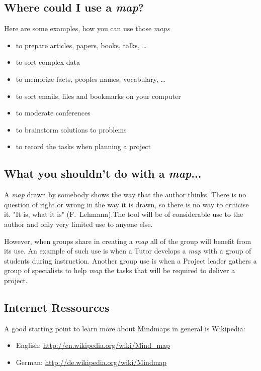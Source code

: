 \documentclass[12pt,a4paper]{article}
\begin{document}
\subsection{Where could I use a {\em map}?}
Here are some examples, how you can use those {\em maps}
\begin{itemize}
    \item to prepare articles, papers, books, talks, \ldots
    \item to sort complex data
    \item to memorize facts, peoples names, vocabulary, \ldots
    \item to sort emails, files and bookmarks on your computer
    \item to moderate conferences
    \item to brainstorm solutions to problems
    \item to record the tasks when planning a project
\end{itemize}

\subsection{What you shouldn't do with a {\em map}...}
A {\em map} drawn by somebody shows the way that the author thinks. There is
no question of right or wrong in the way it is drawn, so there is no way to criticise
it. "It is, what it is" ({\sc F.~Lehmann}).The tool will be of considerable use to the author and only very limited use to anyone else. 

However, when groups share in creating a {\em map} all of the group will benefit from its use. An example of such use is when a Tutor develops a {\em map} with a group of students during instruction. Another group use is when a Project leader gathers a group of specialists to help {\em map} the tasks that will be required to deliver a project.


\subsection{Internet Ressources} 
A good starting point to learn more about Mindmaps in general is Wikipedia:
\begin{itemize}
    \item English: 
        \href{http://en.wikipedia.org/wiki/Mind_map}{http://en.wikipedia.org/wiki/Mind\_map}
    \item German: 
        \href{http://de.wikipedia.org/wiki/Mindmap}{http://de.wikipedia.org/wiki/Mindmap}
\end{itemize}
\end{document}

